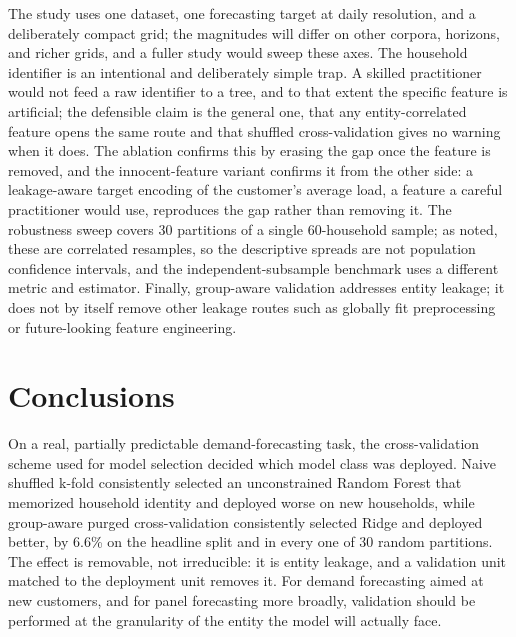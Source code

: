 \documentclass[forecasting,article,submit,oneauthor,pdftex]{Definitions/mdpi}
\begin{document}
The study uses one dataset, one forecasting target at daily resolution, and a
deliberately compact grid; the magnitudes will differ on other corpora, horizons,
and richer grids, and a fuller study would sweep these axes. The household
identifier is an intentional and deliberately simple trap. A skilled practitioner
would not feed a raw identifier to a tree, and to that extent the specific
feature is artificial; the defensible claim is the general one, that any
entity-correlated feature opens the same route and that shuffled cross-validation
gives no warning when it does. The ablation confirms this by erasing the gap once
the feature is removed, and the innocent-feature variant confirms it from the
other side: a leakage-aware target encoding of the customer's average load, a
feature a careful practitioner would use, reproduces the gap rather than removing
it. The robustness sweep covers 30 partitions of a single 60-household sample; as
noted, these are correlated resamples, so the descriptive spreads are not
population confidence intervals, and the independent-subsample benchmark uses a
different metric and estimator. Finally, group-aware validation addresses entity
leakage; it does not by itself remove other leakage routes such as globally fit
preprocessing or future-looking feature engineering.

\section{Conclusions}

On a real, partially predictable demand-forecasting task, the cross-validation
scheme used for model selection decided which model class was deployed. Naive
shuffled k-fold consistently selected an unconstrained Random Forest that
memorized household identity and deployed worse on new households, while
group-aware purged cross-validation consistently selected Ridge and deployed
better, by 6.6\% on the headline split and in every one of 30 random partitions.
The effect is removable, not irreducible: it is entity leakage, and a validation
unit matched to the deployment unit removes it. For demand forecasting aimed at
new customers, and for panel forecasting more broadly, validation should be
performed at the granularity of the entity the model will actually face.

\vspace{6pt}

\end{document}
